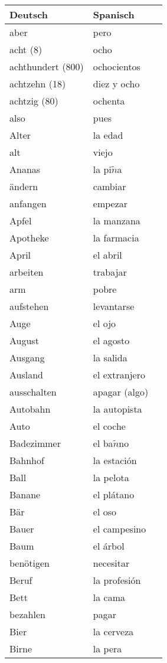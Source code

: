 \documentclass[10pt,spanish]{article}
\begin{document}
\begin{longtable}{p{} p{} | p{}} 
\textbf{Deutsch}     & \textbf{Spanisch}                                       \\ \hline
\hline
\endhead %
aber & pero  \\
acht (8) & ocho  \\
achthundert (800) & ochocientos \\
achtzehn (18) & diez y ocho  \\
achtzig (80) & ochenta  \\
also & pues  \\
Alter & la edad  \\
alt & viejo  \\
Ananas & la pi$\tilde{n}$a  \\
ändern & cambiar \\
anfangen & empezar  \\
Apfel & la manzana \\
Apotheke & la farmacia  \\
April & el abril   \\
arbeiten & trabajar  \\
arm & pobre \\
aufstehen & levantarse \\
Auge & el ojo  \\
August & el agosto  \\
Ausgang & la salida  \\
Ausland & el extranjero \\
ausschalten & apagar (algo)  \\
Autobahn & la autopista \\
Auto & el coche  \\
Badezimmer & el ba$\tilde{n}$no  \\
Bahnhof & la estación \\
Ball & la pelota  \\
Banane & el plátano  \\
Bär & el oso \\
Bauer & el campesino  \\
Baum & el árbol \\
benötigen & necesitar  \\
Beruf & la profesión  \\
Bett & la cama  \\
bezahlen & pagar  \\
Bier & la cerveza  \\
Birne & la pera  \\

\end{longtable}
\end{document}
